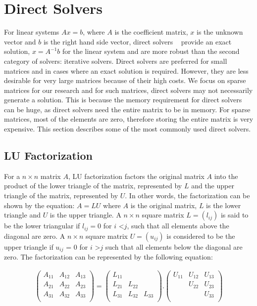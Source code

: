 \section{Direct Solvers} \label{DirectSolvers}
For linear systems $Ax=b$, where $A$ is the coefficient matrix, $x$ is the unknown vector and $b$ is the right hand side vector, direct solvers ~\cite{direct1, direct2} provide an exact solution, $x = A^{-1}b$ for the linear system and are more robust than the second category of solvers: iterative solvers. Direct solvers are preferred for small matrices and in cases where an exact solution is required. However, they are less desirable for very large matrices because of their high costs. We focus on sparse matrices for our research and for such matrices, direct solvers may not necessarily generate a solution. This is because the memory requirement for direct solvers can be huge, as direct solvers need the entire matrix to be in memory. For sparse matrices, most of the elements are zero, therefore storing the entire matrix is very expensive. This section describes some of the most commonly used direct solvers.

\subsection{LU Factorization}
For a $n \times n$ matrix $A$, LU factorization factors the original matrix $A$ into the product of the lower triangle of the matrix, represented by $L$ and the upper triangle of the matrix, represented by $U$. In other words, the factorization can be shown by the equation: $A = LU$ where $A$ is the original matrix, $L$ is the lower triangle and $U$ is the upper triangle. A $n \times n$ square matrix $L=(l_{ij})$ is said to be the lower triangular if $l_{ij} = 0$ for $i$ \textless $j$, such that all elements above the diagonal are zero. A $n \times n$ square matrix $U = (u_{ij})$ is considered to be the upper triangle if $u_{ij}$ = 0 for $i$ \textgreater $j$ such that all elements below the diagonal are zero. The factorization can be represented by the following equation: 

\begin{gather} %
\begin{pmatrix}
A_{11} & A_{12} & A_{13} \\
A_{21} & A_{22} & A_{23} \\
A_{31} & A_{32} & A_{33} \\
\end{pmatrix} 
=
\begin{pmatrix}
L_{11} & &  \\
L_{21} & L_{22} &  \\
L_{31} & L_{32} & L_{33} \\
\end{pmatrix}
.
\begin{pmatrix}
U_{11} & U_{12} & U_{13} \\
& U_{22} & U_{23} \\
&  & U_{33} \\
\end{pmatrix}
\end{gather}


